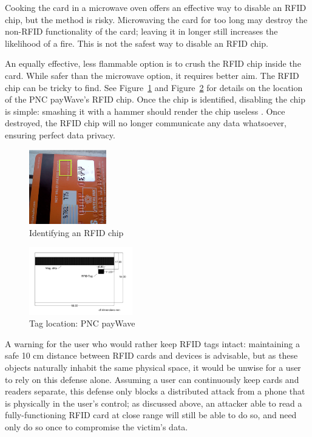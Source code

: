 \documentclass{IEEEtran}
\begin{document}
Cooking the card in a microwave oven offers an effective way to disable an RFID chip, but the method is risky.  Microwaving the card for too long may destroy the non-RFID functionality of the card; leaving it in longer still increases the likelihood of a fire.  This is not the safest way to disable an RFID chip.

An equally effective, less flammable option is to crush the RFID chip inside the card.  While safer than the microwave option, it requires better aim.  The RFID chip can be tricky to find.  See Figure~\ref{fig:RFID_in_PNC_Card} and Figure~\ref{fig:RFID_chip_location} for details on the location of the PNC payWave's RFID chip.  Once the chip is identified, disabling the chip is simple: smashing it with a hammer should render the chip useless \cite{threat-analysis-of-rfid-passports}.  Once destroyed, the RFID chip will no longer communicate any data whatsoever, ensuring perfect data privacy.

	\begin{figure}%
	  \centering
	  \includegraphics[width=0.3\textwidth]{images/RFID_in_PNC_Card.png}
	  \caption{Identifying an RFID chip}
	  \label{fig:RFID_in_PNC_Card}
	\end{figure}

	\begin{figure}%
	  \centering
	  \includegraphics[width=0.4\textwidth]{images/RFID_chip_location.png}
	  \caption{Tag location: PNC payWave}
	  \label{fig:RFID_chip_location}
	\end{figure}

A warning for the user who would rather keep RFID tags intact: maintaining a safe 10 cm distance between RFID cards and devices is advisable, but as these objects naturally inhabit the same physical space, it would be unwise for a user to rely on this defense alone.  Assuming a user can continuously keep cards and readers separate, this defense only blocks a distributed attack from a phone that is physically in the user's control; as discussed above, an attacker able to read a fully-functioning RFID card at close range will still be able to do so, and need only do so once to compromise the victim's data.
\end{document}
